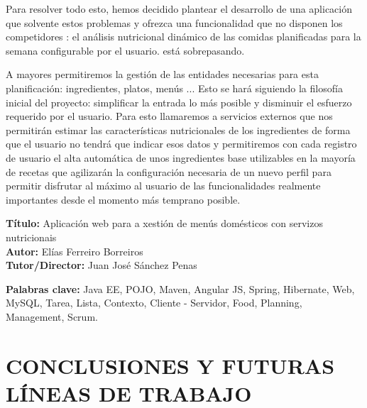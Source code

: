 \documentclass[12pt, a4paper, twoside]{book}
\begin{document}
	Para resolver todo esto, hemos decidido plantear el desarrollo de una aplicación que solvente estos problemas y ofrezca una funcionalidad que no disponen los competidores : el análisis nutricional dinámico de las comidas planificadas para la semana configurable por el usuario. está sobrepasando.
	
	A mayores permitiremos la gestión de las entidades necesarias para esta planificación: ingredientes, platos, menús ... 
	Esto se hará siguiendo la filosofía inicial del proyecto: simplificar la entrada lo más posible y disminuir el esfuerzo requerido por el usuario. 
	Para esto llamaremos a servicios externos que nos permitirán estimar las características nutricionales de los ingredientes de forma que el usuario no tendrá que indicar esos datos y permitiremos con cada registro de usuario el alta automática de unos ingredientes base utilizables en la mayoría de recetas que agilizarán la configuración necesaria de un nuevo perfil para permitir disfrutar al máximo al usuario de las funcionalidades realmente importantes desde el momento más temprano posible.
	
	\clearpage
	
	\textbf{Título:} Aplicación web para a xestión de menús domésticos con servizos nutricionais
	\\
	\textbf{Autor:} Elías Ferreiro Borreiros
	\\
	\textbf{Tutor/Director:} Juan José Sánchez Penas
	
	
	\textbf{Palabras clave:} Java EE, POJO, Maven, Angular JS, Spring, Hibernate, Web, MySQL, Tarea, Lista, Contexto, Cliente - Servidor, Food, Planning, Management, Scrum. 
	
	
	\renewcommand{\contentsname}{Índice de contenidos}
	\renewcommand{\listfigurename}{Índice de figuras}
	\renewcommand{\listtablename}{Índice de tablas}
	
	\tableofcontents %
	
	\listoffigures %
	
	\listoftables %
	
	\clearpage
	
	\chapter{CONCLUSIONES Y FUTURAS LÍNEAS DE TRABAJO}
\end{document}
